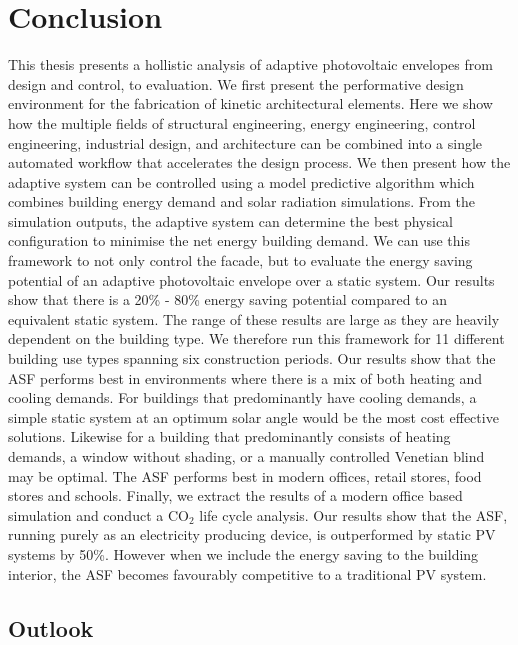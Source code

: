 
\chapter{Conclusion}
\label{ch:conclusion}


This thesis presents a hollistic analysis of adaptive photovoltaic envelopes from design and control, to evaluation. We first present the performative design environment for the fabrication of kinetic architectural elements. Here we show how the multiple fields of structural engineering, energy engineering, control engineering, industrial design, and architecture can be combined into a single automated workflow that accelerates the design process. We then present how the adaptive system can be controlled using a model predictive algorithm which combines building energy demand and solar radiation simulations. From the simulation outputs, the adaptive system can determine the best physical configuration to minimise the net energy building demand. We can use this framework to not only control the facade, but to evaluate the energy saving potential of an adaptive photovoltaic envelope over a static system. Our results show that there is a 20\% - 80\% energy saving potential compared to an equivalent static system. The range of these results are large as they are heavily dependent on the building type. We therefore run this framework for 11 different building use types spanning six construction periods. Our results show that the ASF performs best in environments where there is a mix of both heating and cooling demands. For buildings that predominantly have cooling demands, a simple static system at an optimum solar angle would be the most cost effective solutions. Likewise for a building that predominantly consists of heating demands, a window without shading, or a manually controlled Venetian blind may be optimal. The ASF performs best in modern offices, retail stores, food stores and schools. Finally, we extract the results of a modern office based simulation and conduct a CO$_2$ life cycle analysis. Our results show that the ASF, running purely as an electricity producing device, is outperformed by static PV systems by 50\%. However when we include the energy saving to the building interior, the ASF becomes favourably competitive to a traditional PV system. 


\section{Outlook}
\label{ch:outlook}


